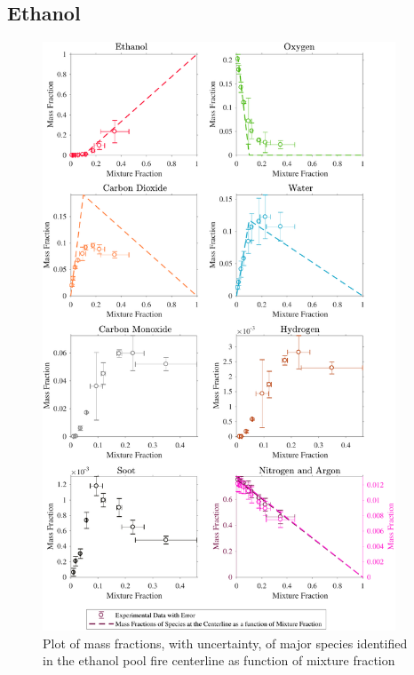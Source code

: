 \documentclass[12pt]{article}
\begin{document}
\subsection{Ethanol}
\label{ssec:Ethanol_ALL_Mix_Frac}
\begin{figure}[h!]
	\centering
\includegraphics[width=10.5cm,keepaspectratio]{Ethanol_Mixture_Fraction_Major_Plot.pdf}
	\caption[Species mass fractions superimposed on ethanol state relations]{Plot of mass fractions, with uncertainty, of major species identified in the ethanol pool fire centerline as function of mixture fraction}
	\label{fig:Ethanol_MIX_Frac_Major}
\end{figure}

\pagebreak
\end{document}
